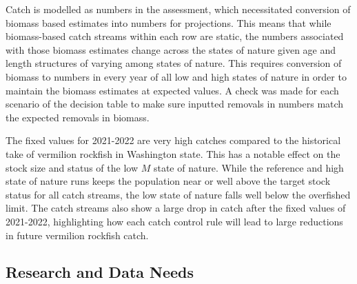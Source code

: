 \documentclass[11pt,
  english,
  a4paper,
]{article}
\begin{document}
\leavevmode\tagmcend\tagstructend\par


Catch is modelled as numbers in the assessment, which necessitated conversion of biomass based estimates into numbers for projections. This means that while biomass-based catch streams within each row are static, the numbers associated with those biomass estimates change across the states of nature given age and length structures of varying among states of nature. This requires conversion of biomass to numbers in every year of all low and high states of nature in order to maintain the biomass estimates at expected values. A check was made for each scenario of the decision table to make sure inputted removals in numbers match the expected removals in biomass.

\leavevmode\tagmcend\tagstructend\par


The fixed values for 2021-2022 are very high catches compared to the historical take of vermilion rockfish in Washington state. This has a notable effect on the stock size and status of the low {\(M\)\leavevmode\tagmcend\tagstructend} state of nature. While the reference and high state of nature runs keeps the population near or well above the target stock status for all catch streams, the low state of nature falls well below the overfished limit. The catch streams also show a large drop in catch after the fixed values of 2021-2022, highlighting how each catch control rule will lead to large reductions in future vermilion rockfish catch.

\leavevmode\tagmcend\tagstructend\par

\clearpage



\clearpage


\hypertarget{research-and-data-needs}{%
\subsection*{Research and Data Needs}\label{research-and-data-needs}}
\end{document}
